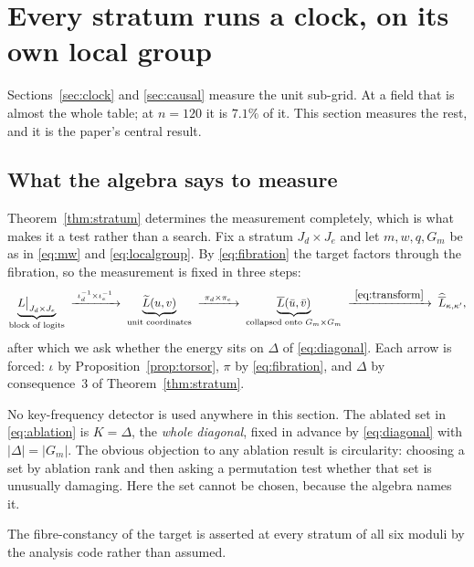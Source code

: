 \section{Every stratum runs a clock, on its own local group}
\label{sec:strata}

Sections~\ref{sec:clock} and \ref{sec:causal} measure the unit sub-grid. At a field that is
almost the whole table; at $n = 120$ it is $7.1\%$ of it. This section measures the rest, and
it is the paper's central result.

\subsection{What the algebra says to measure}
\label{sec:strata-algebra}

Theorem~\ref{thm:stratum} determines the measurement completely, which is what makes it a
test rather than a search. Fix a stratum $J_{d} \times J_{e}$ and let $m, w, q, G_{m}$ be as in
\eqref{eq:mw} and \eqref{eq:localgroup}. By \eqref{eq:fibration} the target factors through the
fibration, so the measurement is fixed in three steps:
\begin{equation}
  \label{eq:pipeline}
  \underbrace{L\big|_{J_{d} \times J_{e}}}_{\text{block of logits}}
  \;\xrightarrow{\ \iota_{d}^{-1} \times \iota_{e}^{-1}\ }\;
  \underbrace{\widetilde{L}(u, v)}_{\text{unit coordinates}}
  \;\xrightarrow{\ \pi_{d} \times \pi_{e}\ }\;
  \underbrace{\overline{L}(\bar{u}, \bar{v})}_{\text{collapsed onto } G_{m} \times G_{m}}
  \;\xrightarrow{\ \eqref{eq:transform}\ }\;
  \widehat{\overline{L}}_{\kappa, \kappa'} ,
\end{equation}
after which we ask whether the energy sits on $\Delta$ of \eqref{eq:diagonal}. Each arrow is
forced: $\iota$ by Proposition~\ref{prop:torsor}, $\pi$ by \eqref{eq:fibration}, and $\Delta$
by consequence~3 of Theorem~\ref{thm:stratum}.

No key-frequency detector is used anywhere in this section. The ablated set in
\eqref{eq:ablation} is $K = \Delta$, the \emph{whole diagonal}, fixed in advance by
\eqref{eq:diagonal} with $|\Delta| = |G_{m}|$. The obvious objection to any ablation result is
circularity: choosing a set by ablation rank and then asking a permutation test whether that
set is unusually damaging. Here the set cannot be
chosen, because the algebra names it.

The fibre-constancy of the target is asserted at every stratum of all six moduli by the
analysis code rather than assumed.

